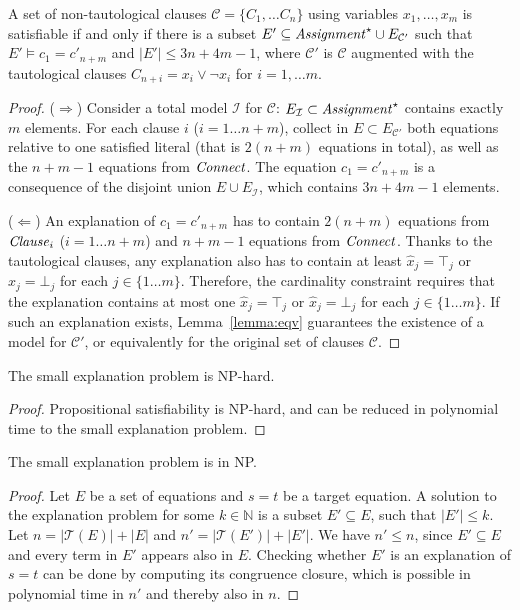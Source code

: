 \documentclass[smallextended]{svjour3}
\begin{document}
\begin{lemma}
A set of non-tautological clauses $\mathcal{C}= \{C_1, \dots C_n\}$ using
variables $x_1,\dots, x_m$ is satisfiable if and only if there is a subset $E'
\subseteq {\it Assignment}^\star \cup E_{\mathcal{C}'}$ such that $E'\models
c_1 = c'_{n+m}$ and $|E'| \leq 3n+4m-1$, where $\mathcal{C}'$ is
$\mathcal{C}$ augmented with the tautological clauses $C_{n+i} = x_i \vee \neg
x_i$ for $i=1,\dots m$.
\end{lemma}
\begin{proof}
($\Rightarrow$)  Consider a total model $\mathcal{I}$ for
$\mathcal{C}$: $E_{\mathcal{I}} \subset {\it Assignment}^\star$ contains exactly $m$
elements.  For each clause $i$ ($i= 1\dots n + m$), collect in $E\subset
E_{\mathcal{C}'}$ both equations relative to one satisfied literal (that is $2(n
+m)$ equations in total), as well as the $n + m - 1$ equations from ${\it Connect}$.
The equation $c_1 = c'_{n+m}$ is a consequence of the disjoint union
$E \cup E_{\mathcal{I}}$, which contains $3n + 4m - 1$ elements.

($\Leftarrow$)  An explanation of $c_1 = c'_{n+m}$ has to contain $2(n + m)$ equations from ${\it Clause}_i$ 
($i= 1\dots n + m$) and $n + m - 1$ equations from ${\it Connect}$.  Thanks to the tautological
clauses, any explanation also has to contain at least $\hat{x}_j = \top_j$ or
$\hat{x}_j = \bot_j$ for each $j\in\{1\dots m\}$.  Therefore, the cardinality
constraint requires that the explanation contains at most one $\hat{x}_j =
\top_j$ or $\hat{x}_j = \bot_j$ for each $j\in\{1\dots m\}$.  If such an
explanation exists, Lemma~\ref{lemma:eqv} guarantees the existence of a model
for $\mathcal{C'}$, or equivalently for the original set of clauses
$\mathcal{C}$.
\end{proof}

\begin{corollary}[NP-hardness]
\label{lemma:nphardness}
The small explanation problem is NP-hard.
\end{corollary}
\begin{proof}
Propositional satisfiability is NP-hard, and can be reduced in polynomial time to the small explanation problem.
\end{proof}

\begin{lemma}[NP]
\label{lemma:innp}
The small explanation problem is in NP.
\end{lemma}
\begin{proof}
Let $E$ be a set of equations and $s=t$ be a target equation.
A solution to the explanation problem for some $k \in \mathbb{N}$ is a subset $E' \subseteq E$, such that $|E'| \leq k$.
Let $n = |\mathcal{T}(E)| + |E|$ and $n' = |\mathcal{T}(E')| + |E'|$.
We have $n' \leq n$, since $E' \subseteq E$ and every term in $E'$ appears also in $E$.
Checking whether $E'$ is an explanation of $s=t$ can be done by computing its congruence closure, which is possible in polynomial time in $n'$ \cite{Nelson2} and thereby also in $n$.

\end{proof}
\end{document}
